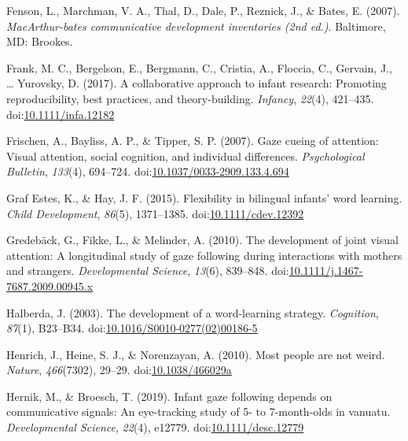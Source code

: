 \documentclass[,man,floatsintext]{apa6}
\begin{document}
\leavevmode\hypertarget{ref-Fenson_etal_2007}{}%
Fenson, L., Marchman, V. A., Thal, D., Dale, P., Reznick, J., \& Bates, E. (2007). \emph{MacArthur-bates communicative development inventories (2nd ed.)}. Baltimore, MD: Brookes.

\leavevmode\hypertarget{ref-Frank_etal_2017}{}%
Frank, M. C., Bergelson, E., Bergmann, C., Cristia, A., Floccia, C., Gervain, J., \ldots{} Yurovsky, D. (2017). A collaborative approach to infant research: Promoting reproducibility, best practices, and theory-building. \emph{Infancy}, \emph{22}(4), 421--435. doi:\href{https://doi.org/10.1111/infa.12182}{10.1111/infa.12182}

\leavevmode\hypertarget{ref-Frischen_etal_2007}{}%
Frischen, A., Bayliss, A. P., \& Tipper, S. P. (2007). Gaze cueing of attention: Visual attention, social cognition, and individual differences. \emph{Psychological Bulletin}, \emph{133}(4), 694--724. doi:\href{https://doi.org/10.1037/0033-2909.133.4.694}{10.1037/0033-2909.133.4.694}

\leavevmode\hypertarget{ref-GrafEstes_Hay_2015}{}%
Graf Estes, K., \& Hay, J. F. (2015). Flexibility in bilingual infants' word learning. \emph{Child Development}, \emph{86}(5), 1371--1385. doi:\href{https://doi.org/10.1111/cdev.12392}{10.1111/cdev.12392}

\leavevmode\hypertarget{ref-Gredeback_etal_2010}{}%
Gredebäck, G., Fikke, L., \& Melinder, A. (2010). The development of joint visual attention: A longitudinal study of gaze following during interactions with mothers and strangers. \emph{Developmental Science}, \emph{13}(6), 839--848. doi:\href{https://doi.org/10.1111/j.1467-7687.2009.00945.x}{10.1111/j.1467-7687.2009.00945.x}

\leavevmode\hypertarget{ref-Halberda_2003}{}%
Halberda, J. (2003). The development of a word-learning strategy. \emph{Cognition}, \emph{87}(1), B23--B34. doi:\href{https://doi.org/10.1016/S0010-0277(02)00186-5}{10.1016/S0010-0277(02)00186-5}

\leavevmode\hypertarget{ref-Henrich_etal_2010}{}%
Henrich, J., Heine, S. J., \& Norenzayan, A. (2010). Most people are not weird. \emph{Nature}, \emph{466}(7302), 29--29. doi:\href{https://doi.org/10.1038/466029a}{10.1038/466029a}

\leavevmode\hypertarget{ref-Hernik_Broesch_2019}{}%
Hernik, M., \& Broesch, T. (2019). Infant gaze following depends on communicative signals: An eye-tracking study of 5- to 7-month-olds in vanuatu. \emph{Developmental Science}, \emph{22}(4), e12779. doi:\href{https://doi.org/10.1111/desc.12779}{10.1111/desc.12779}
\end{document}
